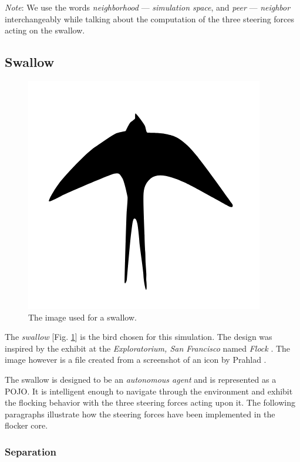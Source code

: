 \documentclass[../main]{subfiles}
\begin{document}
{\em Note}: We use the words {\em neighborhood} --- {\em simulation space}, and {\em peer} --- {\em neighbor} interchangeably while talking about the computation of the three steering forces acting on the swallow.

\subsection{Swallow}
\label{swallow}

\begin{figure}
	\centering
	\includegraphics[scale=0.15, frame]{resources/swallow.png}
	\caption{The image used for a swallow.}
	\label{swallowImg}
\end{figure}

The {\em swallow} [Fig. \ref{swallowImg}] is the bird chosen for this simulation. The design was inspired by the exhibit at the {\em Exploratorium, San Francisco} named {\em Flock} \cite{jillflock}. The image however is a  file created from a screenshot of an icon by Prahlad \cite{apSwallow}.

The swallow is designed to be an {\em autonomous agent} and is represented as a POJO. It is intelligent enough to navigate through the environment and exhibit the flocking behavior with the three steering forces acting upon it. The following paragraphs illustrate how the steering forces have been implemented in the flocker core.

\subsubsection{Separation}
\label{separation}
\end{document}
